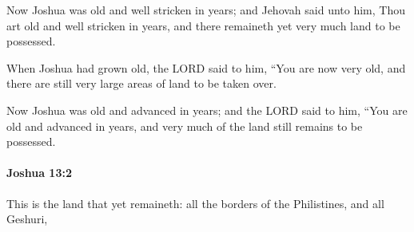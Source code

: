 			\begin{versebox}
					\item[BHS] 
					\item[ASV] Now Joshua was old and well stricken in years; and Jehovah said unto him, Thou art old and well stricken in years, and there remaineth yet very much land to be possessed.
					\item[NIV] When Joshua had grown old, the LORD said to him, “You are now very old, and there are still very large areas of land to be taken over.
					\item[NRSV] Now Joshua was old and advanced in years; and the LORD said to him, “You are old and advanced in years, and very much of the land still remains to be possessed.
			\end{versebox}

		\paragraph{Joshua 13:2} %
			\label{JOSHUA-13-2}

			This is the land that yet remaineth: all the borders of the Philistines, and all Geshuri,

